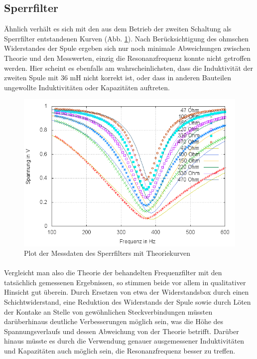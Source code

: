 \subsection{Sperrfilter}
Ähnlich verhält es sich mit den aus dem Betrieb der zweiten Schaltung als Sperrfilter entstandenen Kurven (Abb. \ref{plot:sperr}). Nach Berücksichtigung des ohmschen Widerstandes der Spule ergeben sich nur noch minimale Abweichungen zwischen Theorie und den Messwerten, einzig die Resonanzfrequenz konnte nicht getroffen werden. Hier scheint es ebenfalls am wahrscheinlichsten, dass die Induktivität der zweiten Spule mit 36 mH nicht korrekt ist, oder dass in anderen Bauteilen ungewollte Induktivitäten oder Kapazitäten auftreten.
\\
\begin{figure}[h]
        \includegraphics[width=.9\textwidth]{images/plot/sperrfilter+theorie+R_L.png}
\caption{Plot der Messdaten des Sperrfilters mit Theoriekurven}
\label{plot:sperr}
\end{figure}

\paragraph{}Vergleicht man also die Theorie der behandelten Frequenzfilter mit den tatsächlich gemessenen Ergebnissen, so stimmen beide vor allem in qualitativer Hinsicht gut überein. Durch Ersetzen von etwa der Widerstandsbox durch einen Schichtwiderstand, eine Reduktion des Widerstands der Spule sowie durch Löten der Kontake an Stelle von gewöhnlichen Steckverbindungen müssten darüberhinaus deutliche Verbesserungen möglich sein, was die Höhe des Spannungsverlaufs und dessen Abweichung von der Theorie betrifft. 
Darüber hinaus müsste es durch die Verwendung genauer ausgemessener Induktivitäten und Kapazitäten auch möglich sein, die Resonanzfrequenz besser zu treffen. 